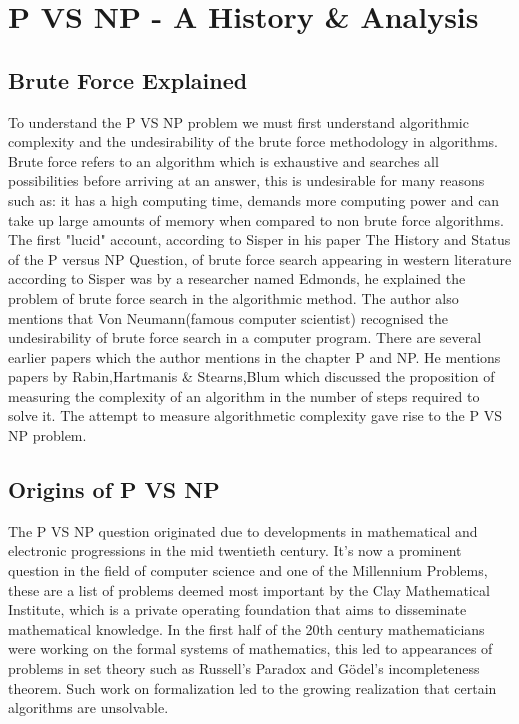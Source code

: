 \documentclass{report}
\begin{document}
\chapter{P VS NP - A History \& Analysis}
\section{Brute Force Explained}
To understand the P VS NP problem we must first understand algorithmic complexity and the undesirability of the brute force methodology in algorithms.
Brute force refers to an algorithm which is exhaustive and searches all possibilities before arriving at an answer, this is undesirable for many reasons such as: it has a high computing time, demands more computing power and can take up large amounts of memory when compared to non brute force algorithms.  The first "lucid" account, according to Sisper in his paper The History and Status of the P versus NP Question, of brute force search appearing in western literature according to Sisper was by a researcher named Edmonds\cite{HistoryOfPVsNP}, he explained the problem of brute force search in the algorithmic method.  The author also mentions that Von Neumann(famous computer scientist\cite{Neumann}) recognised the undesirability of brute force search in a computer program. There are several earlier papers which the author mentions in the chapter P and NP. He mentions papers by Rabin\cite{ResearchPaperRabin},Hartmanis \& Stearns\cite{ResearchPaperHartmanis},Blum\cite{ResearchPaperBlum} which discussed the proposition of measuring the complexity of an algorithm in the number of steps required to solve it. The attempt to measure algorithmetic complexity gave rise to the P VS NP problem.
\section{Origins of P VS NP}
The P VS NP question originated due to developments in mathematical and electronic progressions in the mid twentieth century\cite{HistoryOfPVsNP}. It's now a prominent question in the field of computer science and one of the Millennium Problems\cite{Millennium}, these are a list of problems deemed most important by the Clay Mathematical Institute, which is a private operating foundation that aims to disseminate mathematical knowledge\cite{AboutMillennium}.  In the first half of the 20th century mathematicians were working on the formal systems of mathematics\cite{ResearchPaperFormalizeMathematics}, this led to appearances of problems in set theory such as Russell's Paradox\cite{RussellParadox} and Gödel's incompleteness theorem\cite{Godel}. Such work on formalization led to the growing realization that certain algorithms are unsolvable\cite{HistoryOfPVsNP}.
\end{document}
